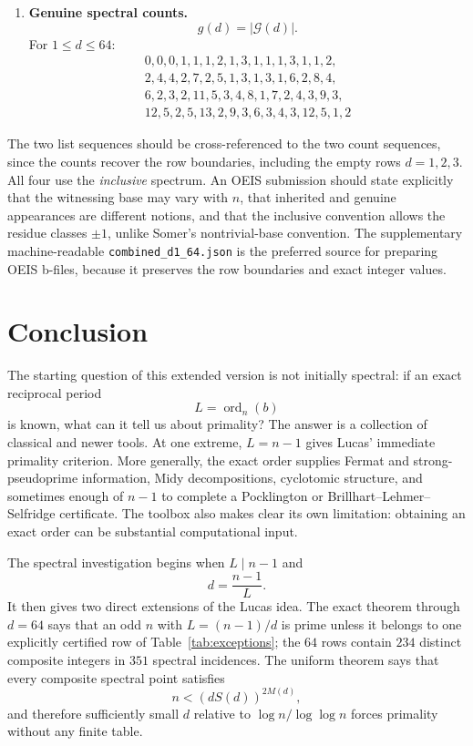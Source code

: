\documentclass[11pt]{article}
\newcommand{\ord}{\operatorname{ord}}
\begin{document}
\begin{enumerate}
\item \textbf{Genuine spectral counts.}
\[
g(d)=|\mathcal G(d)|.
\]
For $1\le d\le64$:
\[
\begin{split}
0,0,0,1,1,1,2,1,3,1,1,1,3,1,1,2,\\
2,4,4,2,7,2,5,1,3,1,3,1,6,2,8,4,\\
6,2,3,2,11,5,3,4,8,1,7,2,4,3,9,3,\\
12,5,2,5,13,2,9,3,6,3,4,3,12,5,1,2
\end{split}
\]
\end{enumerate}

The two list sequences should be cross-referenced to the two count sequences,
since the counts recover the row boundaries, including the empty rows
$d=1,2,3$.  All four use the \emph{inclusive} spectrum.  An OEIS submission
should state explicitly that the witnessing base may vary with $n$, that
inherited and genuine appearances are different notions, and that the
inclusive convention allows the residue classes $\pm1$, unlike Somer's
nontrivial-base convention.  The supplementary machine-readable
\texttt{combined\_d1\_64.json} is the preferred source for preparing OEIS
b-files, because it preserves the row boundaries and exact integer values.

\section{Conclusion}

The starting question of this extended version is not initially spectral:
if an exact reciprocal period
\[
L=\ord_n(b)
\]
is known, what can it tell us about primality?  The answer is a collection of
classical and newer tools.  At one extreme, $L=n-1$ gives Lucas' immediate
primality criterion.  More generally, the exact order supplies Fermat and
strong-pseudoprime information, Midy decompositions, cyclotomic structure,
and sometimes enough of $n-1$ to complete a Pocklington or
Brillhart--Lehmer--Selfridge certificate.  The toolbox also makes clear its
own limitation: obtaining an exact order can be substantial computational
input.

The spectral investigation begins when $L\mid n-1$ and
\[
d=\frac{n-1}{L}.
\]
It then gives two direct extensions of the Lucas idea.  The exact theorem through $d=64$ says that an odd $n$ with $L=(n-1)/d$ is prime unless it belongs to one explicitly certified row of Table~\ref{tab:exceptions}; the $64$ rows contain $234$ distinct composite integers in $351$ spectral incidences.  The uniform theorem says
that every composite spectral point satisfies
\[
n<(dS(d))^{2M(d)},
\]
and therefore sufficiently small $d$ relative to $\log n/\log\log n$ forces
primality without any finite table.
\end{document}
